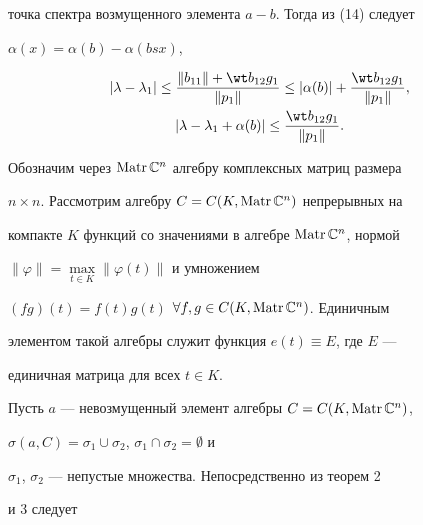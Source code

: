 точка спектра возмущенного элемента $a-b$. Тогда из (14) следует


$\alpha(x)=\alpha(b)-\alpha(bsx)$,


\begin{gather}


|\lambda-\lambda_1|\le\frac{\|b_{11}\|+\wt b_{12}g_1}


{\|p_1\|}\le|\alpha(b)|+\frac{\wt


b_{12}g_1}{\|p_1\|},\\


%


|\lambda-\lambda_1+\alpha(b)|\le\frac{\wt


b_{12}g_1}{\|p_1\|}.


\end{gather}





Обозначим через $\operatorname{Matr}\Bbb{C}^n$ алгебру комплексных матриц размера


$n\times n$. Рассмотрим алгебру $C=C(K,\operatorname{Matr}\Bbb{C}^n)$ непрерывных на


компакте $K$ функций со значениями в алгебре $\operatorname{Matr}\Bbb{C}^n$, нормой


$\|\varphi\|=\max\limits_{t\in K}\|\varphi(t)\|$ и умножением


$(fg)(t)=f(t)g(t)$ $\forall f,g\in C(K,\operatorname{Matr}\Bbb{C}^n)$. Единичным


элементом такой алгебры служит функция $e(t)\equiv E$, где $E$ --- 


единичная матрица для всех $t\in K$.





Пусть $a$ --- невозмущенный элемент алгебры $C=C(K,\operatorname{Matr}\Bbb{C}^n)$,


$\sigma(a,C)=\sigma_1\cup\sigma_2$, $\sigma_1\cap\sigma_2=\emptyset$ и


$\sigma_1$, $\sigma_2$ --- непустые множества. Непосредственно  из теорем 2


и 3 следует








